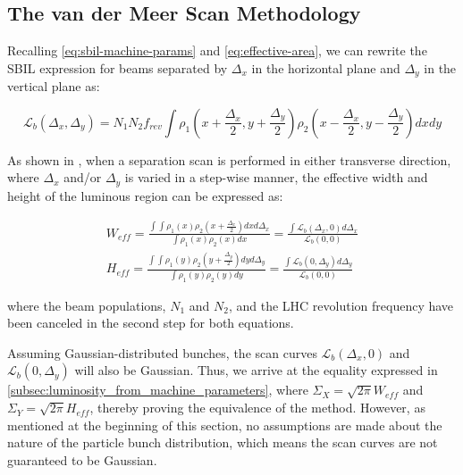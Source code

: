 \subsection{The van der Meer Scan Methodology}
\label{subsec:the_van_der_meer_scan_methodology}

Recalling \autoref{eq:sbil-machine-params} and \autoref{eq:effective-area}, we can rewrite the SBIL expression for beams separated by $\Delta_x$ in the horizontal plane and $\Delta_y$ in the vertical plane as:

\begin{equation}
    \label{eq:sbil_separating_planes}
    \mathcal{L}_b \left( \Delta_x, \Delta_y \right) = N_1 N_2 f_{rev} \int \rho_1 (x + \frac{\Delta_x}{2}, y + \frac{\Delta_y}{2}) \rho_2 (x - \frac{\Delta_x}{2}, y - \frac{\Delta_y}{2}) dx dy
\end{equation}

As shown in \cite{vanderMeer:296752}, when a separation scan is performed in either transverse direction, where $\Delta_x$ and/or $\Delta_y$ is varied in a step-wise manner, the effective width and height of the luminous region can be expressed as:

\begin{equation}
    \begin{aligned}
        \label{eq:effective_width_height_scan}
        W_{eff} = \frac{\int \int \rho_1 (x) \rho_2 (x + \frac{\Delta_x}{2}) dx d\Delta_x}{\int \rho_1 (x) \rho_2 (x) dx} = \frac{\int \mathcal{L}_b \left( \Delta_x, 0 \right) d\Delta_x}{\mathcal{L}_b \left( 0, 0 \right)} \\
        H_{eff} = \frac{\int \int \rho_1 (y) \rho_2 (y + \frac{\Delta_y}{2}) dy d\Delta_y}{\int \rho_1 (y) \rho_2 (y) dy} = \frac{\int \mathcal{L}_b \left( 0, \Delta_y \right) d\Delta_y}{\mathcal{L}_b \left( 0, 0 \right)}
    \end{aligned}
\end{equation}

where the beam populations, $N_1$ and $N_2$, and the LHC revolution frequency have been canceled in the second step for both equations.

Assuming Gaussian-distributed bunches, the scan curves $\mathcal{L}_b \left( \Delta_x, 0 \right)$ and $\mathcal{L}_b \left( 0, \Delta_y \right)$ will also be Gaussian. Thus, we arrive at the equality expressed in \autoref{subsec:luminosity_from_machine_parameters}, where $\Sigma_X = \sqrt{2\pi} W_{eff}$ and $\Sigma_Y = \sqrt{2\pi} H_{eff}$, thereby proving the equivalence of the method. However, as mentioned at the beginning of this section, no assumptions are made about the nature of the particle bunch distribution, which means the scan curves are not guaranteed to be Gaussian.

